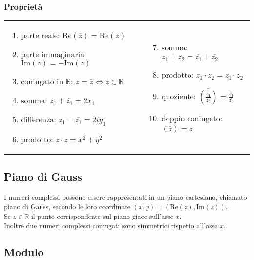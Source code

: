 \documentclass[a4paper]{article}
\newcommand\Real{\text{Re}}
\newcommand\Img{\text{Im}}
\begin{document}
\subsubsection*{Proprietà}
\begin{center}
	\begin{tabular}{m{7cm} m{7cm}}
		\begin{enumerate}
			\item parte reale: \(\Real(\overline{z}) = \Real(z)\)
			\item parte immaginaria: \(\Img(\overline{z}) = -\Img(z)\)
			\item coniugato in \(\mathbb{R}\): \(z = \overline{z} \Leftrightarrow z \in \mathbb{R}\)
			\item somma: \(z_1 + \overline{z_1} = 2 x_1\)
			\item differenza: \(z_1 - \overline{z_1} = 2 i y_1\)
			\item prodotto: \(z \cdot \overline{z} = x^2 + y^2\)
		\end{enumerate}
		&
		\begin{enumerate}
			\setcounter{enumi}{6}
			\item somma: \(\overline{z_1 + z_2} = \overline{z_1} + \overline{z_2}\)
			\item prodotto: \(\overline{z_1 \cdot z_2} = \overline{z_1} \cdot \overline{z_2}\)
			\item quoziente: \(\displaystyle \overline{\left( \frac{z_1}{z_2} \right)} = \frac{\overline{z_1}}{\overline{z_2}}\)
			\item doppio coniugato: \(\overline{\left( \overline{z} \right)} = z\)
		\end{enumerate}
	\end{tabular}
\end{center}


\subsection{Piano di Gauss}
I numeri complessi possono essere rappresentati in un piano cartesiano, chiamato piano di Gauss, secondo le loro coordinate \(\left( x, y \right) = \left( \Real(z), \Img(z) \right)\). \\
Se \(z \in \mathbb{R}\) il punto corrispondente sul piano giace sull'asse \(x\). \\
Inoltre due numeri complessi coniugati sono simmetrici rispetto all'asse \(x\).


\subsection{Modulo}
\end{document}
